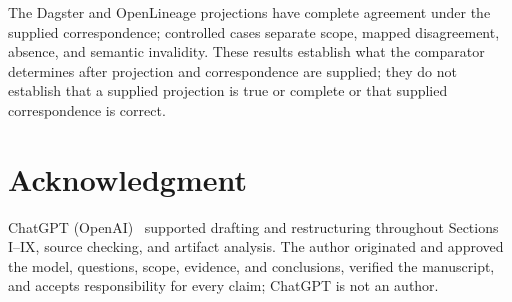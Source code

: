 \documentclass[conference]{IEEEtran}
\theoremstyle{tideproposition}
\begin{document}
The Dagster and OpenLineage projections have complete agreement under the supplied correspondence; controlled cases separate scope, mapped disagreement, absence, and semantic invalidity. These results establish what the comparator determines after projection and correspondence are supplied; they do not establish that a supplied projection is true or complete or that supplied correspondence is correct.

\section*{Acknowledgment}
ChatGPT (OpenAI)~\cite{chatgpt} supported drafting and restructuring
throughout Sections I--IX, source checking, and artifact analysis.
The author originated and approved the model, questions, scope,
evidence, and conclusions, verified the manuscript, and accepts
responsibility for every claim; ChatGPT is not an author.
\end{document}
